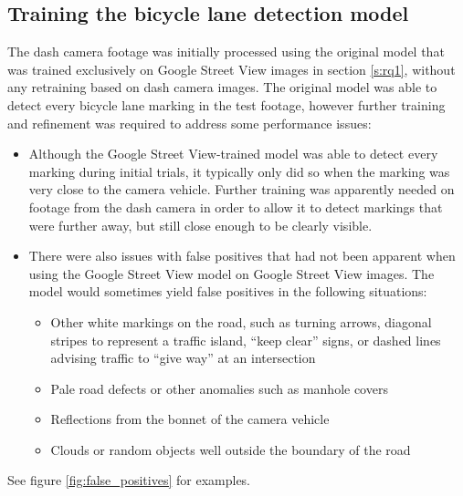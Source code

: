 \documentclass[11pt,twoside]{report}
\begin{document}
\subsection{Training the bicycle lane detection model}
\label{rq3c}

The dash camera footage was initially processed using the original model that was trained exclusively on Google Street View images in section \ref{s:rq1}, without any retraining based on dash camera images.  The original model was able to detect every bicycle lane marking in the test footage, however further training and refinement was required to address some performance issues:

\begin{itemize}
\item{Although the Google Street View-trained model was able to detect every marking during initial trials, it typically only did so when the marking was very close to the camera vehicle.  Further training was apparently needed on footage from the dash camera in order to allow it to detect markings that were further away, but still close enough to be clearly visible.}
\item{There were also issues with false positives that had not been apparent when using the Google Street View model on Google Street View images.  The model would sometimes yield false positives in the following situations:

	\begin{itemize}
	\item{Other white markings on the road, such as turning arrows, diagonal stripes to represent a traffic island, ``keep clear'' signs, or dashed lines advising traffic to ``give way'' at an intersection}
	\item{Pale road defects or other anomalies such as manhole covers}
	\item{Reflections from the bonnet of the camera vehicle}
	\item{Clouds or random objects well outside the boundary of the road}
	\end{itemize}
}
\end{itemize}

See figure \ref{fig:false_positives} for examples.
\end{document}
